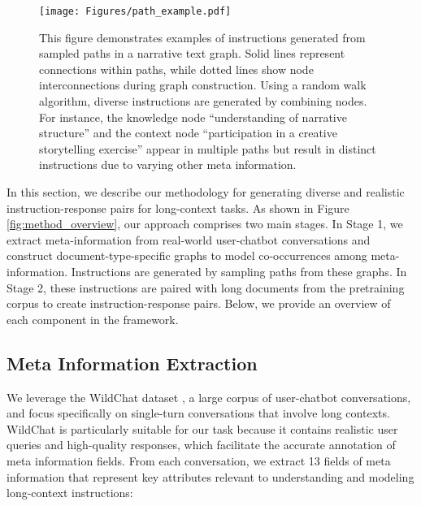 

\begin{figure*}[t]
    \centering
    \texttt{[image: Figures/path\_example.pdf]}
    \caption{This figure demonstrates examples of instructions generated from sampled paths in a narrative text graph. Solid lines represent connections within paths, while dotted lines show node interconnections during graph construction. Using a random walk algorithm, diverse instructions are generated by combining nodes. For instance, the knowledge node ``understanding of narrative structure'' and the context node ``participation in a creative storytelling exercise'' appear in multiple paths but result in distinct instructions due to varying other meta information.}
    \label{fig:path_example}
\end{figure*}

In this section, we describe our methodology for generating diverse and realistic instruction-response pairs for long-context tasks. 
As shown in Figure \ref{fig:method_overview}, our approach comprises two main stages. In Stage 1, we extract meta-information from real-world user-chatbot conversations and construct document-type-specific graphs to model co-occurrences among meta-information. Instructions are generated by sampling paths from these graphs. In Stage 2, these instructions are paired with long documents from the pretraining corpus to create instruction-response pairs. Below, we provide an overview of each component in the framework.

\subsection{Meta Information Extraction}
We leverage the WildChat dataset \citep{zhao2024wildchat}, a large corpus of user-chatbot conversations, and focus specifically on single-turn conversations that involve long contexts. WildChat is particularly suitable for our task because it contains realistic user queries and high-quality responses, which facilitate the accurate annotation of meta information fields.
From each conversation, we extract 13 fields of meta information that represent key attributes relevant to understanding and modeling long-context instructions:

